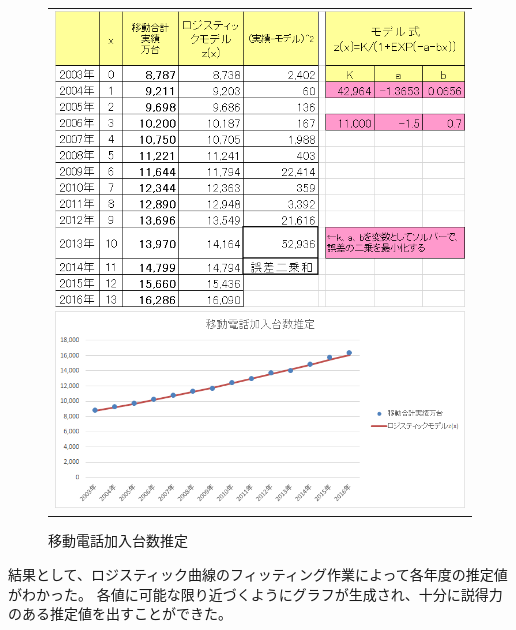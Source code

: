 \documentclass[uplatex, titlepage]{jsarticle}
\begin{document}
\begin{figure}[H]
  \centering
    \begin{tabular}{c}
      \begin{minipage}{0.5\hsize}
        \centering
          \includegraphics[scale = 0.5]{re2/f9.png}
          \caption{ロジスティック曲線によりフィッティングを行うワークシート}
        \label{fig:table5}
      \end{minipage}
      \begin{minipage}{0.5\hsize}
        \centering
          \includegraphics[scale = 0.8]{re2/f10.png}
          \caption{移動電話加入台数推定}
        \label{fig:graphicx5}
      \end{minipage}
  \end{tabular}
\end{figure}


結果として、ロジスティック曲線のフィッティング作業によって各年度の推定値がわかった。
各値に可能な限り近づくようにグラフが生成され、十分に説得力のある推定値を出すことができた。
\end{document}
